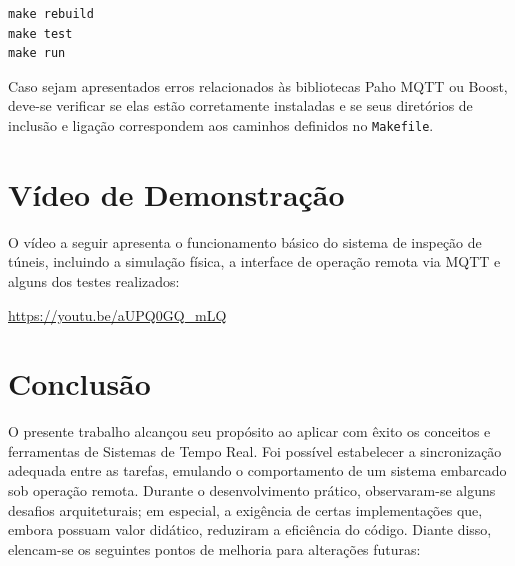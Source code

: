 \documentclass[12pt]{article}
\begin{document}
\begin{verbatim}
make rebuild
make test
make run
\end{verbatim}

Caso sejam apresentados erros relacionados às bibliotecas Paho MQTT ou Boost, deve-se verificar se elas estão corretamente instaladas e se seus diretórios de inclusão e ligação correspondem aos caminhos definidos no \texttt{Makefile}.



\section{Vídeo de Demonstração}

O vídeo a seguir apresenta o funcionamento básico do sistema de inspeção de túneis, incluindo a simulação física, a interface de operação remota via MQTT e alguns dos testes realizados:

\begin{center}
    \url{https://youtu.be/aUPQ0GQ_mLQ}
\end{center}

\section{Conclusão}

O presente trabalho alcançou seu propósito ao aplicar com êxito os conceitos e ferramentas de Sistemas de Tempo Real. Foi possível estabelecer a sincronização adequada entre as tarefas, emulando o comportamento de um sistema embarcado sob operação remota. Durante o desenvolvimento prático, observaram-se alguns desafios arquiteturais; em especial, a exigência de certas implementações que, embora possuam valor didático, reduziram a eficiência do código. Diante disso, elencam-se os seguintes pontos de melhoria para alterações futuras:
\end{document}
